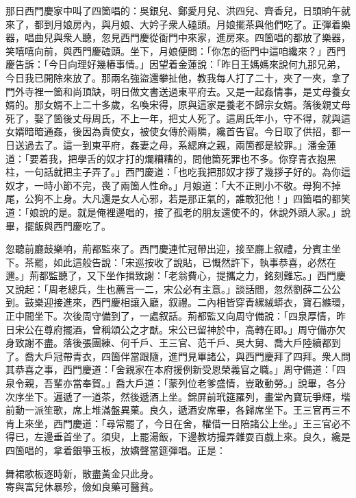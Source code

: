 那日西門慶家中叫了四箇唱的：吳銀兒、鄭愛月兒、洪四兒、齊香兒，日頭晌午就來了，都到月娘房內，與月娘、大妗子衆人磕頭。月娘擺茶與他們吃了。正彈着樂器，唱曲兒與衆人聽，忽見西門慶從衙門中來家，進房來。四箇唱的都放了樂器，笑嘻嘻向前，與西門慶磕頭。坐下，月娘便問：「你怎的衙門中這咱纔來？」西門慶告訴：「今日向理好幾樁事情。」因望着金蓮說：「昨日王媽媽來說何九那兄弟，今日我已開除來放了。那兩名強盜還攀扯他，教我每人打了二十，夾了一夾，拿了門外寺裡一箇和尚頂缺，明日做文書送過東平府去。又是一起姦情事，是丈母養女婿的。那女婿不上二十多歲，名喚宋得，原與這家是養老不歸宗女婿。落後親丈母死了，娶了箇後丈母周氏，不上一年，把丈人死了。這周氏年小，守不得，就與這女婿暗暗通姦，後因為責使女，被使女傳於兩隣，纔首告官。今日取了供招，都一日送過去了。這一到東平府，姦妻之母，系緦麻之親，兩箇都是絞罪。」潘金蓮道：「要着我，把學舌的奴才打的爛糟糟的，問他箇死罪也不多。你穿青衣抱黑柱，一句話就把主子弄了。」{}{}西門慶道：「也吃我把那奴才拶了幾拶子好的。為你這奴才，一時小節不完，䘮了兩箇人性命。」月娘道：「大不正則小不敬。母狗不掉尾，公狗不上身。大凡還是女人心邪，若是那正氣的，誰敢犯他！」{}四箇唱的都笑道：「娘說的是。就是俺裡邊唱的，接了孤老的朋友還使不的，休說外頭人家。」說畢，擺飯與西門慶吃了。

忽聽前廳鼓樂响，荊都監來了。西門慶連忙冠帶出迎，接至廳上叙禮，分賓主坐下。茶罷，如此這般告說：「宋巡按收了說貼，已慨然許下，執事恭喜，必然在邇。」荊都監聽了，又下坐作揖致謝：「老翁費心，提攜之力，銘刻難忘。」西門慶又說起：「周老總兵，生也薦言一二，宋公必有主意。」談話間，忽然劉薛二公公到。鼓樂迎接進來，西門慶相讓入廳，叙禮。二內相皆穿青縲絨蟒衣，寶石縧環，正中間坐下。次後周守備到了，一處叙話。荊都監又向周守備說：「四泉厚情，昨日宋公在尊府擺酒，曾稱頌公之才猷。宋公已留神於中，高轉在即。」周守備亦欠身致謝不盡。落後張團練、何千戶、王三官、范千戶、吳大舅、喬大戶陸續都到了。喬大戶冠帶青衣，四箇伴當跟隨，{}進門見畢諸公，與西門慶拜了四拜。衆人問其恭喜之事，西門慶道：「舍親家在本府援例新受恩榮義官之職。」周守備道：「四泉令親，吾輩亦當奉賀。」喬大戶道：「蒙列位老爹盛情，{}豈敢動勞。」說畢，各分次序坐下。遍遞了一道茶，然後遞酒上坐。錦屏前玳筵羅列，畫堂內寶玩爭輝，堦前動一派笙歌，席上堆滿盤異菓。良久，遞酒安席畢，各歸席坐下。王三官再三不肯上來坐，西門慶道：「尋常罷了，今日在舍，權借一日陪諸公上坐。」王三官必不得已，左邊垂首坐了。須臾，上罷湯飯，下邊教坊撮弄雜耍百戲上來。良久，纔是四箇唱的，拿着銀箏玉板，放嬌聲當筵彈唱。正是：

\begin{myquote} 
舞裙歌板逐時新，散盡黃金只此身。\\寄與富兒休暴殄，儉如良藥可醫貧。
\end{myquote} 

